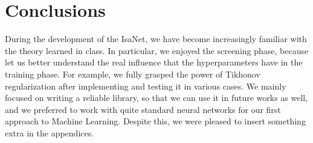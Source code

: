 \documentclass[11pt]{article}
\begin{document}

\section{Conclusions}
\label{sec:conclusions}
During the development of the IsaNet, we have become increasingly familiar with the theory learned in class. In particular, we enjoyed the screening phase, because let us better understand the real influence that the hyperparameters have in the training phase. For example, we fully grasped the power of Tikhonov regularization after implementing and testing it in various cases. We mainly focused on writing a reliable library, so that we can use it in future works as well, and we preferred to work with quite standard neural networks for our first approach to Machine Learning. Despite this, we were pleased to insert something extra in the appendices.
\end{document}

